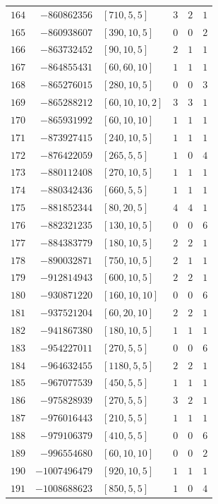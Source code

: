 \documentclass[11pt]{article}
\begin{document}
\begin{center}
\begin{longtable}{r r l c c c}
$164$ & $-860862356$ & $[710,5,5]$ & $3$ & $2$ & $1$\\
$165$ & $-860938607$ & $[390,10,5]$ & $0$ & $0$ & $2$\\
$166$ & $-863732452$ & $[90,10,5]$ & $2$ & $1$ & $1$\\
$167$ & $-864855431$ & $[60,60,10]$ & $1$ & $1$ & $1$\\
$168$ & $-865276015$ & $[280,10,5]$ & $0$ & $0$ & $3$\\
$169$ & $-865288212$ & $[60,10,10,2]$ & $3$ & $3$ & $1$\\
$170$ & $-865931992$ & $[60,10,10]$ & $1$ & $1$ & $1$\\
$171$ & $-873927415$ & $[240,10,5]$ & $1$ & $1$ & $1$\\
$172$ & $-876422059$ & $[265,5,5]$ & $1$ & $0$ & $4$\\
$173$ & $-880112408$ & $[270,10,5]$ & $1$ & $1$ & $1$\\
$174$ & $-880342436$ & $[660,5,5]$ & $1$ & $1$ & $1$\\
$175$ & $-881852344$ & $[80,20,5]$ & $4$ & $4$ & $1$\\
$176$ & $-882321235$ & $[130,10,5]$ & $0$ & $0$ & $6$\\
$177$ & $-884383779$ & $[180,10,5]$ & $2$ & $2$ & $1$\\
$178$ & $-890032871$ & $[750,10,5]$ & $2$ & $1$ & $1$\\
$179$ & $-912814943$ & $[600,10,5]$ & $2$ & $2$ & $1$\\
$180$ & $-930871220$ & $[160,10,10]$ & $0$ & $0$ & $6$\\
$181$ & $-937521204$ & $[60,20,10]$ & $2$ & $2$ & $1$\\
$182$ & $-941867380$ & $[180,10,5]$ & $1$ & $1$ & $1$\\
$183$ & $-954227011$ & $[270,5,5]$ & $0$ & $0$ & $6$\\
$184$ & $-964632455$ & $[1180,5,5]$ & $2$ & $2$ & $1$\\
$185$ & $-967077539$ & $[450,5,5]$ & $1$ & $1$ & $1$\\
$186$ & $-975828939$ & $[270,5,5]$ & $3$ & $2$ & $1$\\
$187$ & $-976016443$ & $[210,5,5]$ & $1$ & $1$ & $1$\\
$188$ & $-979106379$ & $[410,5,5]$ & $0$ & $0$ & $6$\\
$189$ & $-996554680$ & $[60,10,10]$ & $0$ & $0$ & $2$\\
$190$ & $-1007496479$ & $[920,10,5]$ & $1$ & $1$ & $1$\\
$191$ & $-1008688623$ & $[850,5,5]$ & $1$ & $0$ & $4$\\

\end{longtable}
\end{center}
\end{document}
